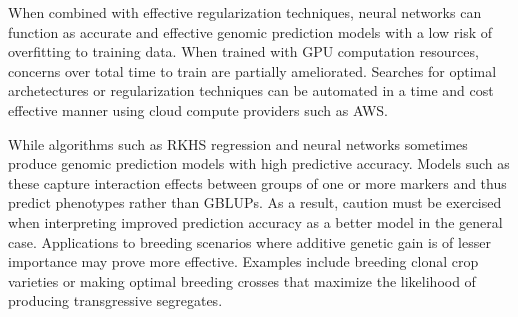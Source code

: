 When combined with effective regularization techniques, neural networks can function
as accurate and effective genomic prediction models with a low risk of overfitting
to training data. When trained with GPU computation resources, concerns
over total time to train are partially ameliorated. Searches for optimal archetectures or 
regularization techniques can be automated in a time and cost effective 
manner using cloud compute providers such as AWS.

While algorithms such as RKHS regression and neural networks sometimes produce
genomic prediction models with high predictive accuracy. Models such as these
capture interaction effects between groups of one or more markers and thus 
predict phenotypes rather than GBLUPs. As a result, caution must be exercised when interpreting 
improved prediction accuracy as a better model in the general case. Applications 
to breeding scenarios where additive genetic gain is of lesser importance 
may prove more effective. Examples include breeding clonal crop varieties or 
making optimal breeding crosses that maximize the likelihood of producing
transgressive segregates.
